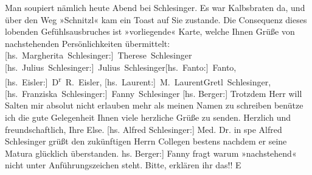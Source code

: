 \begin{ledgroupsized}[t]{13cm}
           \pstart
           Man soupiert nämlich heute Abend bei Schlesinger. Es war Kalbsbraten da, und über den Weg »Schnitzl« kam ein
               Toast auf Sie zustande. Die Consequenz dieses lobenden Gefühlsausbruches ist
               »vorliegende« Karte, welche Ihnen Grüße von nachstehenden Persönlichkeiten
               übermittelt:\pend
           \pstart \spacefill\mbox{{[}hs. Margherita Schlesinger:{]} Therese Schlesinger}{ }\spacefill\mbox{{[}hs. Julius Schlesinger:{]} Julius Schlesinger}\spacefill\mbox{{[}hs. Fanto:{]} Fanto}, \spacefill\mbox{{[}hs. Eisler:{]} D\textsuperscript{r} R. Eisler},
               \spacefill\mbox{{[}hs. Laurent:{]} M. Laurent}\spacefill\mbox{Gretl Schlesinger,}\spacefill\mbox{{[}hs. Franziska Schlesinger:{]} Fanny Schlesinger}\pend{}\pstart
           {[}hs. Berger:{]} Trotzdem Herr \introOben{}will\introOben{} Salten mir absolut nicht erlauben mehr als meinen Namen
               zu schreiben benütze ich die gute Gelegenheit Ihnen viele herzliche Grüße zu
               senden.\pend
           \pstart
           Herzlich und freundschaftlich, Ihre \spacefill\mbox{Else.}\pend
           \pstart
           {[}hs. Alfred Schlesinger:{]} Med. Dr. \introOben{}in spe\introOben{} Alfred Schlesinger grüßt den zukünftigen Herrn Collegen
               bestens nachdem er seine Matura glücklich überstanden.\pend
           \pstart
           \noindent{}{[}hs. Berger:{]} Fanny fragt warum »nachstehend« nicht unter Anführungszeichen steht. Bitte,
                  erklären  ihr das!! \spacefill\mbox{E}\pend
           
         
         \endnumbering{}\end{ledgroupsized}\begin{anhang}\end{anhang}\newcommand{\dateiname}{L03177}\newcommand{\titel}{Felix Salten u. a. an Arthur Schnitzler, 6. 8. 1896}\newcommand{\editorInnen}{Martin Anton Müller und Laura Untner}
      